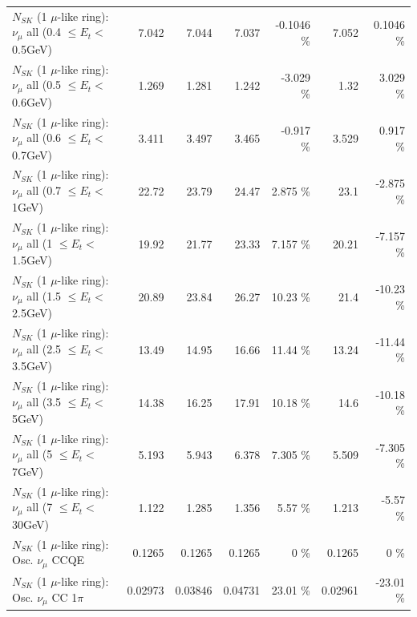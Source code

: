 \begin{table}
\begin{tabular}{| l | r | r | r  r | r  r |}
       $N_{SK}$ (1 $\mu$-like ring): $\nu_{\mu}$ all (0.4 $\leq E_{t} <$ 0.5GeV) &           7.042 &           7.044 &           7.037 &  -0.1046 \%  &           7.052 &   0.1046 \%  \\ 
       $N_{SK}$ (1 $\mu$-like ring): $\nu_{\mu}$ all (0.5 $\leq E_{t} <$ 0.6GeV) &           1.269 &           1.281 &           1.242 &   -3.029 \%  &            1.32 &    3.029 \%  \\ 
       $N_{SK}$ (1 $\mu$-like ring): $\nu_{\mu}$ all (0.6 $\leq E_{t} <$ 0.7GeV) &           3.411 &           3.497 &           3.465 &   -0.917 \%  &           3.529 &    0.917 \%  \\ 
         $N_{SK}$ (1 $\mu$-like ring): $\nu_{\mu}$ all (0.7 $\leq E_{t} <$ 1GeV) &           22.72 &           23.79 &           24.47 &    2.875 \%  &            23.1 &   -2.875 \%  \\ 
         $N_{SK}$ (1 $\mu$-like ring): $\nu_{\mu}$ all (1 $\leq E_{t} <$ 1.5GeV) &           19.92 &           21.77 &           23.33 &    7.157 \%  &           20.21 &   -7.157 \%  \\ 
       $N_{SK}$ (1 $\mu$-like ring): $\nu_{\mu}$ all (1.5 $\leq E_{t} <$ 2.5GeV) &           20.89 &           23.84 &           26.27 &    10.23 \%  &            21.4 &   -10.23 \%  \\ 
       $N_{SK}$ (1 $\mu$-like ring): $\nu_{\mu}$ all (2.5 $\leq E_{t} <$ 3.5GeV) &           13.49 &           14.95 &           16.66 &    11.44 \%  &           13.24 &   -11.44 \%  \\ 
         $N_{SK}$ (1 $\mu$-like ring): $\nu_{\mu}$ all (3.5 $\leq E_{t} <$ 5GeV) &           14.38 &           16.25 &           17.91 &    10.18 \%  &            14.6 &   -10.18 \%  \\ 
           $N_{SK}$ (1 $\mu$-like ring): $\nu_{\mu}$ all (5 $\leq E_{t} <$ 7GeV) &           5.193 &           5.943 &           6.378 &    7.305 \%  &           5.509 &   -7.305 \%  \\ 
          $N_{SK}$ (1 $\mu$-like ring): $\nu_{\mu}$ all (7 $\leq E_{t} <$ 30GeV) &           1.122 &           1.285 &           1.356 &     5.57 \%  &           1.213 &    -5.57 \%  \\ 
\hline
\hline
                               $N_{SK}$ (1 $\mu$-like ring): Osc. $\nu_\mu$ CCQE &          0.1265 &          0.1265 &          0.1265 &        0 \%  &          0.1265 &        0 \%  \\ 
                          $N_{SK}$ (1 $\mu$-like ring): Osc. $\nu_\mu$ CC 1$\pi$ &         0.02973 &         0.03846 &         0.04731 &    23.01 \%  &         0.02961 &   -23.01 \%  \\ 

\end{tabular}
\end{table}
